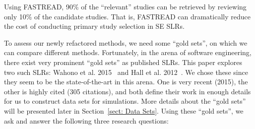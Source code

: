 \documentclass[final,twocolumn,5p]{elsarticle}
\theoremstyle{break}
\begin{document}
Using FASTREAD, 90\% of the ``relevant'' studies can
  be retrieved by reviewing only 10\% of the candidate studies. That is,
  FASTREAD can dramatically reduce the cost of conducting primary study selection in SE SLRs.
   

To assess our newly refactored methods,
we need some ``gold sets'',
on which we can compare different methods. Fortunately, in the arena of software
engineering, there exist very prominent ``gold sets'' as published SLRs. This paper explores two such SLRs: Wahono et al. 2015~\cite{wahono2015systematic} and Hall et
al. 2012~\cite{hall2012systematic}.  We chose these since they seem to be the
state-of-the-art in this arena. One is very recent (2015), the other is highly
cited (305 citations), and both define their work in enough details for us to construct data sets for simulations. 
More details about the ``gold
sets'' will be presented later in Section~\ref{sect: Data Sets}. Using
these ``gold sets'', we ask and answer the following three research questions:
\end{document}
